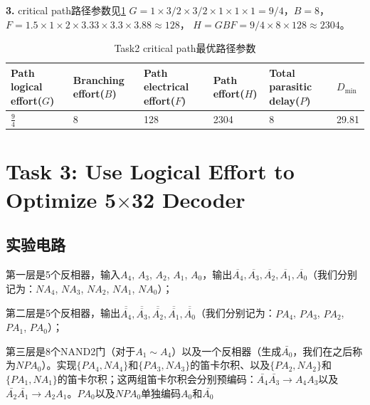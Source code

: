 \documentclass[UTF8,12pt,a4paper]{ctexart}
\begin{document}
\textbf{3.} critical path路径参数见\ref{tab:task2_best_path_params}
$G = 1 \times 3/2 \times 3/2 \times 1 \times 1 \times 1 = 9/4 $，$B = 8 $，
$F = 1.5\times 1 \times 2 \times 3.33 \times 3.3 \times 3.88 \approx 128$，
$H = GBF = 9/4 \times 8 \times 128 \approx 2304$。

\begin{table}[htbp]
    \centering
    \caption{Task2 critical path最优路径参数}
    \label{tab:task2_best_path_params}
    \begin{tabularx}{\linewidth}{XXXXXX}
    \toprule
    Path logical effort($G$) & Branching effort($B$) &
    Path electrical effort($F$) & Path effort($H$) &
    Total parasitic delay($P$) & $D_{\text{min}}$ \\
    \midrule
    $\frac{9}{4}$ & 8 & 128 & 2304 & 8 &  29.81 \\
    \bottomrule
    \end{tabularx}
\end{table}

\newpage
\section{Task 3: Use Logical Effort to Optimize 5$\times$32 Decoder}

\subsection{实验电路}

第一层是5个反相器，输入$A_4$, $A_3$, $A_2$, $A_1$, $A_0$，输出$\overline{A_4}, \overline{A_3}, \overline{A_2}, \overline{A_1}, \overline{A_0}$（我们分别记为：$NA_4$, $NA_3$, $NA_2$, $NA_1$, $NA_0$）；

第二层是5个反相器，输出$\overline{\overline{A_4}}, \overline{\overline{A_3}}, \overline{\overline{A_2}}, \overline{\overline{A_1}}, \overline{\overline{A_0}}$（我们分别记为：$PA_4$, $PA_3$, $PA_2$, $PA_1$, $PA_0$）；

第三层是8个NAND2门（对于$A_1 \sim A_4$）以及一个反相器（生成$\bar{A_0}$，我们在之后称为$NPA_0$）。实现$\{PA_4, NA_4\}$和$\{PA_3, NA_3\}$的笛卡尔积、以及$\{PA_2, NA_2\}$和$\{PA_1, NA_1\}$的笛卡尔积；这两组笛卡尔积会分别预编码：$\bar{A_4}\bar{A_3} \rightarrow A_{4}A_{3}$以及$\bar{A_2}\bar{A_1} \rightarrow A_{2}A_{1}$。$PA_0$以及$NPA_0$单独编码$A_0$和$\bar{A_0}$
\end{document}
